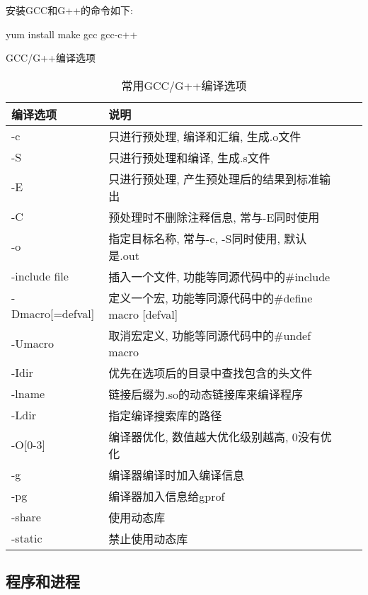安装GCC和G++的命令如下:
\begin{shell}
 yum install make gcc gcc-c++
\end{shell}

GCC/G++编译选项
\begin{table}[H]
\small %
\sffamily %
\centering %
\renewcommand{\arraystretch}{1.4} %
\caption{常用GCC/G++编译选项}
\begin{tabular}{*{2}{l|l}}
 \hline
 \bfseries 编译选项 & \bfseries 说明 \\
 \hline
 -c & 只进行预处理, 编译和汇编, 生成.o文件\\
 \hline
 -S & 只进行预处理和编译, 生成.s文件\\
 \hline
 -E & 只进行预处理, 产生预处理后的结果到标准输出\\
 \hline
 -C & 预处理时不删除注释信息, 常与-E同时使用\\
 \hline
 -o & 指定目标名称, 常与-c, -S同时使用, 默认是.out\\
 \hline
 -include file & 插入一个文件, 功能等同源代码中的\#include\\
 \hline
 -Dmacro[=defval] & 定义一个宏, 功能等同源代码中的\#define macro [defval]\\
 \hline
 -Umacro & 取消宏定义, 功能等同源代码中的\#undef macro\\
 \hline
 -Idir & 优先在选项后的目录中查找包含的头文件\\
 \hline
 -lname & 链接后缀为.so的动态链接库来编译程序\\
 \hline
 -Ldir & 指定编译搜索库的路径\\
 \hline
 -O[0-3] & 编译器优化, 数值越大优化级别越高, 0没有优化\\
 \hline
 -g & 编译器编译时加入编译信息\\
 \hline
 -pg & 编译器加入信息给gprof\\
 \hline
 -share & 使用动态库\\
 \hline
 -static & 禁止使用动态库\\
 \hline
\end{tabular}
\end{table}


\subsection{程序和进程}

